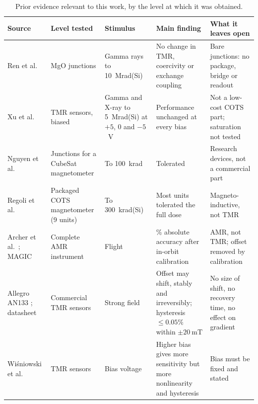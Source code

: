\documentclass[12pt,a4paper]{article}
\begin{document}
\begin{table}[H]
\centering
\caption{Prior evidence relevant to this work, by the level at which it was obtained.}
\label{tab:lit-synthesis}
\small
\begin{tabular}{@{}>{\raggedright\arraybackslash}p{}>{\raggedright\arraybackslash}p{}>{\raggedright\arraybackslash}p{}>{\raggedright\arraybackslash}p{}>{\raggedright\arraybackslash}p{}@{}}
\toprule
Source & Level tested & Stimulus & Main finding & What it leaves open \\
\midrule
Ren et al.\ \cite{ren2012} & MgO junctions & Gamma rays to \SI{10}{\mega rad}(Si) & No change in TMR, coercivity or exchange coupling & Bare junctions: no package, bridge or readout \\
Xu et al.\ \cite{tmr-bias-radiation} & TMR sensors, biased & Gamma and X-ray to \SI{5}{\mega rad}(Si) at $+5$, 0 and $-5$~V & Performance unchanged at every bias & Not a low-cost COTS part; saturation not tested \\
Nguyen et al.\ \cite{nguyen2010} & Junctions for a CubeSat magnetometer & To \SI{100}{\kilo rad} & Tolerated & Research devices, not a commercial part \\
Regoli et al.\ \cite{regoli2020} & Packaged COTS magnetometer (9 units) & To \SI{300}{\kilo rad}(Si) & Most units tolerated the full dose & Magneto-inductive, not TMR \\
Archer et al.\ \cite{archer2015}; MAGIC \cite{magic-radcube} & Complete AMR instrument & Flight & 2\% absolute accuracy after in-orbit calibration & AMR, not TMR; offset removed by calibration \\
Allegro AN133 \cite{allegro_an133}; datasheet \cite{ct100_datasheet} & Commercial TMR sensors & Strong field & Offset may shift, stably and irreversibly; hysteresis $\le 0.05\%$ within $\pm\SI{20}{\milli\tesla}$ & No size of shift, no recovery time, no effect on gradient \\
Wi\'sniowski et al.\ \cite{wisniowski2021} & TMR sensors & Bias voltage & Higher bias gives more sensitivity but more nonlinearity and hysteresis & Bias must be fixed and stated \\
\bottomrule
\end{tabular}
\end{table}
\end{document}
